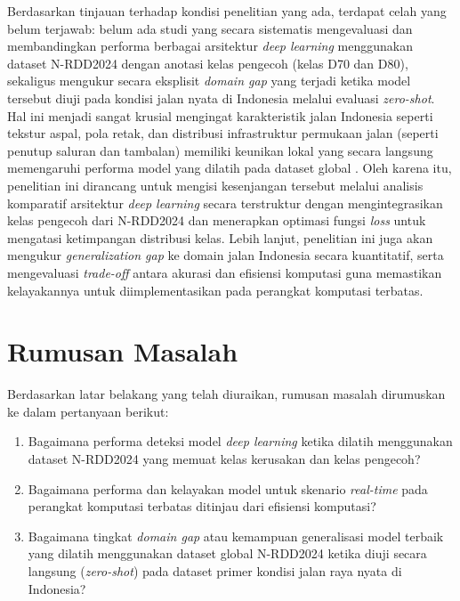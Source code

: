 Berdasarkan tinjauan terhadap kondisi penelitian yang ada, terdapat celah yang belum terjawab: belum ada studi yang secara sistematis mengevaluasi dan membandingkan performa berbagai arsitektur \textit{deep learning} menggunakan dataset N-RDD2024 dengan anotasi kelas pengecoh (kelas D70 dan D80), sekaligus mengukur secara eksplisit \textit{domain gap} yang terjadi ketika model tersebut diuji pada kondisi jalan nyata di Indonesia melalui evaluasi \textit{zero-shot}. Hal ini menjadi sangat krusial mengingat karakteristik jalan Indonesia seperti tekstur aspal, pola retak, dan distribusi infrastruktur permukaan jalan (seperti penutup saluran dan tambalan) memiliki keunikan lokal yang secara langsung memengaruhi performa model yang dilatih pada dataset global  \cite{Arya2024846, hugo2025efficientdet}. Oleh karena itu, penelitian ini dirancang untuk mengisi kesenjangan tersebut melalui analisis komparatif arsitektur \textit{deep learning} secara terstruktur dengan mengintegrasikan kelas pengecoh dari N-RDD2024 dan menerapkan optimasi fungsi \textit{loss} untuk mengatasi ketimpangan distribusi kelas. Lebih lanjut, penelitian ini juga akan mengukur \textit{generalization gap} ke domain jalan Indonesia secara kuantitatif, serta mengevaluasi \textit{trade-off} antara akurasi dan efisiensi komputasi guna memastikan kelayakannya untuk diimplementasikan pada perangkat komputasi terbatas.

\section{Rumusan Masalah}
Berdasarkan latar belakang yang telah diuraikan, rumusan masalah dirumuskan ke dalam pertanyaan berikut:
\begin{enumerate}
  \item Bagaimana performa deteksi model \textit{deep learning} ketika dilatih menggunakan dataset N-RDD2024 yang memuat kelas kerusakan dan kelas pengecoh?
  \item Bagaimana performa dan kelayakan model untuk skenario \textit{real-time} pada perangkat komputasi terbatas ditinjau dari efisiensi komputasi?
  \item Bagaimana tingkat \textit{domain gap} atau kemampuan generalisasi model terbaik yang dilatih menggunakan dataset global N-RDD2024 ketika diuji secara langsung (\textit{zero-shot}) pada dataset primer kondisi jalan raya nyata di Indonesia?
\end{enumerate}


